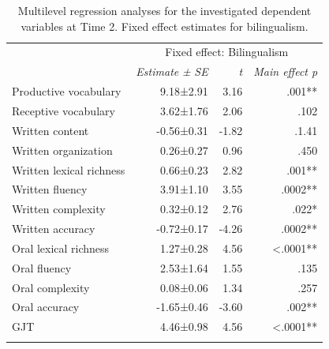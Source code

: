 \documentclass[output=paper,modfonts,nonflat,newtxmath]{langsci/langscibook}
\begin{document}
\begin{table}
	\caption{\label{tab:pfenninger:8} Multilevel regression analyses for the investigated dependent variables at Time 2. Fixed effect estimates for bilingualism.}

	\begin{tabularx}{0.83\textwidth}{l rrr}
		\lsptoprule
		& \multicolumn{3}{c}{ Fixed effect: Bilingualism}\\
		\cmidrule{2-4}
		& \textit{Estimate} \textit{±} \textit{SE} & \textit{t}  & \textit{Main effect p}\\
		\midrule
		Productive vocabulary & 9.18±2.91 & 3.16 & .001**\\
		Receptive vocabulary & 3.62±1.76 & 2.06 & .102\\
		Written content & -0.56±0.31 & -1.82 & .1.41\\
		Written organization & 0.26±0.27 & 0.96 & .450\\
		Written lexical richness & 0.66±0.23 & 2.82 & .001**\\
		Written fluency & 3.91±1.10 & 3.55 & .0002**\\
		Written complexity & 0.32±0.12 & 2.76 & .022*\\
		Written accuracy & -0.72±0.17 & -4.26 & .0002**\\
		Oral lexical richness & 1.27±0.28 & 4.56 & <.0001**\\
		Oral fluency & 2.53±1.64 & 1.55 & .135\\
		Oral complexity & 0.08±0.06 & 1.34 & .257\\
		Oral accuracy & -1.65±0.46 & -3.60 & .002**\\
		GJT & 4.46±0.98 & 4.56 & <.0001**\\
		\lspbottomrule
	\end{tabularx}
\end{table}
\end{document}
